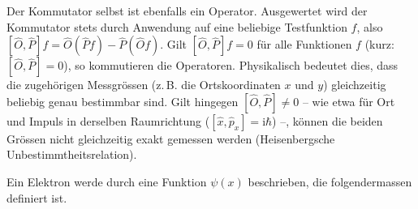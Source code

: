 \documentclass[11pt]{article}
\begin{document}
Der Kommutator selbst ist ebenfalls ein Operator. Ausgewertet wird der Kommutator stets durch Anwendung auf eine beliebige Testfunktion $f$, also $[\hat O,\hat P]f=\hat O(\hat Pf)-\hat P(\hat Of)$. Gilt $[\hat O,\hat P]f=0$ für alle Funktionen $f$ (kurz: $[\hat O,\hat P]=0$), so kommutieren die Operatoren. Physikalisch bedeutet dies, dass die zugehörigen Messgrössen (z.\,B. die Ortskoordinaten $x$ und $y$) gleichzeitig beliebig genau bestimmbar sind. Gilt hingegen $[\hat O,\hat P]\neq 0$ -- wie etwa für Ort und Impuls in derselben Raumrichtung ($[\hat x,\hat p_x]=\mathrm{i}\hbar$) --, können die beiden Grössen nicht gleichzeitig exakt gemessen werden (Heisenbergsche Unbestimmtheitsrelation).

Ein Elektron werde durch eine Funktion $\psi(x)$ beschrieben, die folgendermassen definiert ist.
\end{document}
